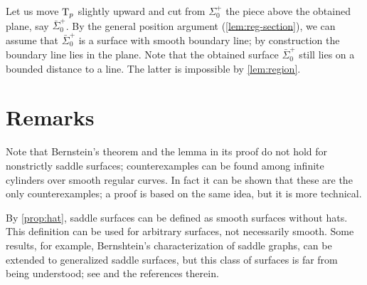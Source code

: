 Let us move $\mathrm{T}_p$ slightly upward and cut from $\Sigma^+_0$ the piece above the obtained plane, say $\bar\Sigma^+_0$.
By the general position argument (\ref{lem:reg-section}),
we can assume that $\bar\Sigma^+_0$ is a surface with smooth boundary line;
by construction the boundary line lies in the plane.
Note that the obtained surface $\bar\Sigma^+_0$ still lies on a bounded distance to a line.
The latter is impossible by \ref{lem:region}.
\qeds

\section*{Remarks}

Note that Bernstein's theorem and the lemma in its proof do not hold for nonstrictly saddle surfaces;
counterexamples can be found among infinite cylinders over smooth regular curves.
In fact it can be shown that these are the only counterexamples;
a proof is based on the same idea, but it is more technical.

By \ref{prop:hat}, saddle surfaces can be defined as smooth surfaces without hats.
This definition can be used for arbitrary surfaces, not necessarily smooth.
Some results, for example, Bernshtein's characterization of saddle graphs, can be extended to generalized saddle surfaces, but this class of surfaces is far from being understood; see \cite[Chapter 4]{alexander-kapovitch-petrunin2019} and the references therein.
